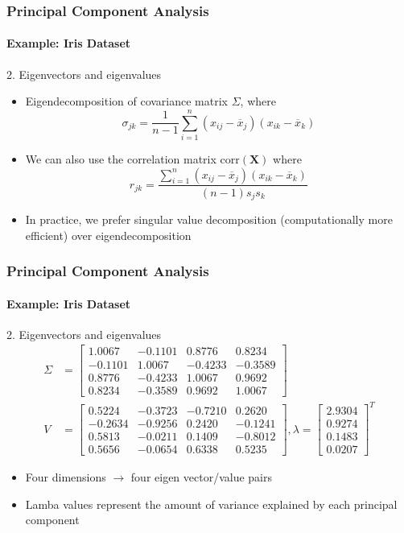 \documentclass[12pt,a4paper,xcolor=dvipsnames,xcolor=table]{beamer}
\begin{document}
\begin{frame}[t]
\frametitle{Principal Component Analysis}
\framesubtitle{Example: Iris Dataset}
    2. Eigenvectors and eigenvalues
    \begin{itemize}
         \item Eigendecomposition of covariance matrix $\Sigma$, where 
             \[
                 \sigma_{jk} = \frac{1}{n-1}\sum_{i=1}^{n}(x_{ij}-\overline{x}_j)(x_{ik}-\overline{x}_k)
             \]
     \item We can also use the correlation matrix $\mathrm{corr}(\mathbf{X})$ where 
         \[
             r_{jk} = \frac{\sum_{i=1}^{n}(x_{ij}-\overline{x}_j)(x_{ik}-\overline{x}_k)}{(n-1)s_j s_k}   
         \]
         
         \item In practice, we prefer singular value decomposition (computationally more efficient) over eigendecomposition
    \end{itemize}
\end{frame}

\begin{frame}[t]
\frametitle{Principal Component Analysis}
\framesubtitle{Example: Iris Dataset}
    2. Eigenvectors and eigenvalues
    \begin{align*}
        \Sigma &= \begin{bmatrix}
            1.0067 & -0.1101 & 0.8776 & 0.8234\\
            -0.1101 & 1.0067 & -0.4233 & -0.3589\\  
            0.8776 & -0.4233 & 1.0067 & 0.9692\\
            0.8234 & -0.3589 & 0.9692 & 1.0067
        \end{bmatrix}\\
        V &= \begin{bmatrix}
            0.5224 & -0.3723 & -0.7210 & 0.2620\\
            -0.2634 & -0.9256 & 0.2420 & -0.1241\\
            0.5813 & -0.0211 & 0.1409 & -0.8012\\
            0.5656 & -0.0654 & 0.6338 & 0.5235
        \end{bmatrix}, \lambda = \begin{bmatrix}
            2.9304\\ 0.9274\\ 0.1483\\ 0.0207
        \end{bmatrix}^T
    \end{align*}
    \begin{itemize}
        \item Four dimensions $\to$ four eigen vector/value pairs
        \item Lamba values represent the amount of variance explained by each principal component 
    \end{itemize}
\end{frame}
\end{document}
